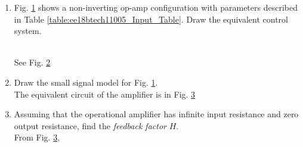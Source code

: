 \begin{enumerate}[label=\thesection.\arabic*.,ref=\thesection.\theenumi]

\item Fig. \ref{fig:ee18btech11005_original_circuit} shows a  non-inverting op-amp configuration   with parameters described in Table \ref{table:ee18btech11005_Input_Table}.  Draw the equivalent control system.
\renewcommand{\thefigure}{\theenumi.\arabic{figure}}
%
\begin{figure}[!ht]
	\begin{center}
		
		\resizebox{\columnwidth}{!}{}
	\end{center}
\caption{}
\label{fig:ee18btech11005_original_circuit}
\end{figure}
%
\begin{table}[!ht]
\centering

\caption{}
\label{table:ee18btech11005_Input_Table}
\end{table}
\\
\solution  See 	Fig. \ref{fig:ee18btech11005_equivalent_control_system}
\begin{figure}[!ht]
	\begin{center}
			\resizebox{\columnwidth}{!}{}
	\end{center}
\caption{}
\label{fig:ee18btech11005_equivalent_control_system}
\end{figure}
\renewcommand{\thefigure}{\theenumi}

\item Draw the small signal model for Fig. \ref{fig:ee18btech11005_original_circuit}.
\\
\solution
The equivalent circuit of the amplifier is in Fig. \ref{fig:ee18btech11005_equivalent_circuit}
\begin{figure}[!ht]
	\begin{center}
		
		\resizebox{\columnwidth}{!}{}
	\end{center}
\caption{}
\label{fig:ee18btech11005_equivalent_circuit}
\end{figure}

\item Assuming that the operational amplifier has infinite input resistance and zero output resistance, find  the {\em feedback factor} $H$.
\\
\solution From Fig. \ref{fig:ee18btech11005_equivalent_circuit},


\end{enumerate}
